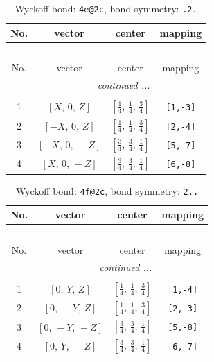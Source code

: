 \documentclass[fleqn,8pt]{jsarticle}
\begin{document}
\renewcommand{\arraystretch}{1.2}
\begin{longtable}{cccc}
\caption{Wyckoff bond: {\tt 4e@2c}, bond symmetry: {\tt .2.}}
 \\
 \hline \hline
No. & vector & center & mapping \\ \hline \endfirsthead

\multicolumn{3}{l}{\tablename\ \thetable{}} \\
 \hline \hline
No. & vector & center & mapping \\ \hline \endhead

 \hline \hline
\multicolumn{3}{r}{\footnotesize\it continued ...} \\ \endfoot

 \hline \hline
\multicolumn{3}{r}{} \\ \endlastfoot

1 & $\left[ X,\, 0,\, Z \right]$ & $\left[ \frac{1}{4},\, \frac{1}{4},\, \frac{3}{4} \right]$ & {\tt [1,-3]} \\ \hline
2 & $\left[ - X,\, 0,\, Z \right]$ & $\left[ \frac{1}{4},\, \frac{1}{4},\, \frac{3}{4} \right]$ & {\tt [2,-4]} \\ \hline
3 & $\left[ - X,\, 0,\, - Z \right]$ & $\left[ \frac{3}{4},\, \frac{3}{4},\, \frac{1}{4} \right]$ & {\tt [5,-7]} \\ \hline
4 & $\left[ X,\, 0,\, - Z \right]$ & $\left[ \frac{3}{4},\, \frac{3}{4},\, \frac{1}{4} \right]$ & {\tt [6,-8]} \\
\end{longtable}
\renewcommand{\arraystretch}{1.2}
\begin{longtable}{cccc}
\caption{Wyckoff bond: {\tt 4f@2c}, bond symmetry: {\tt 2..}}
 \\
 \hline \hline
No. & vector & center & mapping \\ \hline \endfirsthead

\multicolumn{3}{l}{\tablename\ \thetable{}} \\
 \hline \hline
No. & vector & center & mapping \\ \hline \endhead

 \hline \hline
\multicolumn{3}{r}{\footnotesize\it continued ...} \\ \endfoot

 \hline \hline
\multicolumn{3}{r}{} \\ \endlastfoot

1 & $\left[ 0,\, Y,\, Z \right]$ & $\left[ \frac{1}{4},\, \frac{1}{4},\, \frac{3}{4} \right]$ & {\tt [1,-4]} \\ \hline
2 & $\left[ 0,\, - Y,\, Z \right]$ & $\left[ \frac{1}{4},\, \frac{1}{4},\, \frac{3}{4} \right]$ & {\tt [2,-3]} \\ \hline
3 & $\left[ 0,\, - Y,\, - Z \right]$ & $\left[ \frac{3}{4},\, \frac{3}{4},\, \frac{1}{4} \right]$ & {\tt [5,-8]} \\ \hline
4 & $\left[ 0,\, Y,\, - Z \right]$ & $\left[ \frac{3}{4},\, \frac{3}{4},\, \frac{1}{4} \right]$ & {\tt [6,-7]} \\
\end{longtable}
\end{document}
